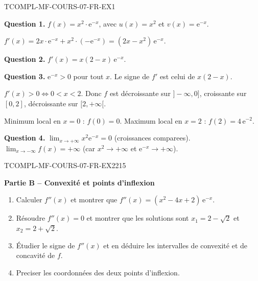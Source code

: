\begin{corrige}{TCOMPL-MF-COURS-07-FR-EX1}

\textbf{Question 1.} $f(x) = x^2 \cdot \mathrm{e}^{-x}$, avec $u(x) = x^2$ et $v(x) = \mathrm{e}^{-x}$.

$f'(x) = 2x \cdot \mathrm{e}^{-x} + x^2 \cdot (-\mathrm{e}^{-x}) = (2x - x^2)\,\mathrm{e}^{-x}$.

\textbf{Question 2.} $f'(x) = x(2-x)\,\mathrm{e}^{-x}$.

\textbf{Question 3.} $\mathrm{e}^{-x} > 0$ pour tout $x$. Le signe de $f'$ est celui de $x(2-x)$.

$f'(x) > 0 \iff 0 < x < 2$. Donc $f$ est décroissante sur $]-\infty, 0]$, croissante sur $[0, 2]$, décroissante sur $[2, +\infty[$.

Minimum local en $x = 0$ : $f(0) = 0$. Maximum local en $x = 2$ : $f(2) = 4\,\mathrm{e}^{-2}$.

\textbf{Question 4.} $\lim_{x \to +\infty} x^2 \mathrm{e}^{-x} = 0$ (croissances comparees). $\lim_{x \to -\infty} f(x) = +\infty$ (car $x^2 \to +\infty$ et $\mathrm{e}^{-x} \to +\infty$).

\end{corrige}

\bigskip


\begin{exercice}{TCOMPL-MF-COURS-07-FR-EX2}{2}{15}

\textbf{Partie B -- Convexité et points d'inflexion}

\begin{enumerate}
  \item Calculer $f''(x)$ et montrer que $f''(x) = (x^2 - 4x + 2)\,\mathrm{e}^{-x}$.
  \item Résoudre $f''(x) = 0$ et montrer que les solutions sont $x_1 = 2 - \sqrt{2}$ et $x_2 = 2 + \sqrt{2}$.
  \item Étudier le signe de $f''(x)$ et en déduire les intervalles de convexité et de concavité de $f$.
  \item Preciser les coordonnées des deux points d'inflexion.
\end{enumerate}

\end{exercice}

